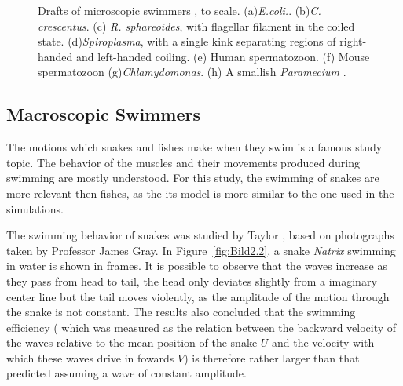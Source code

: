 \begin{figure}[H]
\centering
  \begin{footnotesize}
  
  \caption[Drafts of microscopic swimmers , to scale. (a)\textit{E.coli.}. (b)\textit{C. crescentus}. (c) \textit{R. sphareoides}, with flagellar filament in the coiled
   state. (d)\textit{Spiroplasma}, with a single kink separating regions of right-handed and left-handed coiling. (e) Human spermatozoon. (f) Mouse spermatozoon (g)\textit{Chlamydomonas}.
   (h) A smallish \textit{Paramecium} \cite{lauga_hydrodynamics_2009}.]{Drafts of microscopic swimmers , to scale. (a)\textit{E.coli.}. (b)\textit{C. crescentus}. (c) \textit{R. sphareoides}, with flagellar filament in the coiled
   state. (d)\textit{Spiroplasma}, with a single kink separating regions of right-handed and left-handed coiling. (e) Human spermatozoon. (f) Mouse spermatozoon (g)\textit{Chlamydomonas}.
   (h) A smallish \textit{Paramecium} \cite{lauga_hydrodynamics_2009}.}
  \label{fig:Bild2.1}
  \end{footnotesize}
\end{figure} 

\subsection{Macroscopic Swimmers}
\label{sec:section 1}


The motions which snakes and fishes make when they swim is a famous study topic\cite{taylor_analysis_1952}. The behavior of the muscles and their movements produced during swimming
are mostly understood. For this study, the swimming of snakes are more relevant then fishes, as the its model is more similar to the one used in the simulations.\par

The swimming behavior of snakes was studied by Taylor \cite{taylor_analysis_1952}, based on photographs taken by Professor James Gray. In Figure~\ref{fig:Bild2.2}, a snake \textit{Natrix} swimming in water is shown in
frames. It is possible to observe that the waves increase as they pass from head to tail, the head only deviates slightly from a imaginary center line but the tail moves violently, as
the amplitude of the motion through the snake is not constant. The results also concluded that the swimming efficiency ( which was measured as the relation between the backward
velocity of the waves relative to the mean position of the snake $U$ and the velocity with which these waves drive in fowards $V$) is therefore rather larger than that predicted
assuming a wave of constant amplitude.\par

